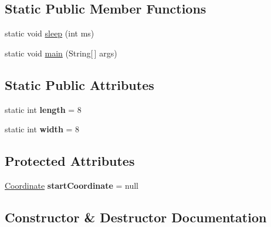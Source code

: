 \subsection*{Static Public Member Functions}
\begin{DoxyCompactItemize}
\item 
static void \hyperlink{classmain_1_1_game_controller_a92e6cb717e1d095d52e1f3db9899b3b4}{sleep} (int ms)
\item 
static void \hyperlink{classmain_1_1_game_controller_a868da5d6ac8b5b1d1c90cfb3957e2c3d}{main} (String\mbox{[}$\,$\mbox{]} args)
\end{DoxyCompactItemize}
\subsection*{Static Public Attributes}
\begin{DoxyCompactItemize}
\item 
\hypertarget{classmain_1_1_game_controller_a7aecbb578b9ec77925dd8a5fbd1c3841}{}\label{classmain_1_1_game_controller_a7aecbb578b9ec77925dd8a5fbd1c3841} 
static int {\bfseries length} = 8
\item 
\hypertarget{classmain_1_1_game_controller_a7b79e272fdf025df06ef83134c5f00f5}{}\label{classmain_1_1_game_controller_a7b79e272fdf025df06ef83134c5f00f5} 
static int {\bfseries width} = 8
\end{DoxyCompactItemize}
\subsection*{Protected Attributes}
\begin{DoxyCompactItemize}
\item 
\hypertarget{classmain_1_1_game_controller_a8a1459a02deb30c69520506ca6d52e4d}{}\label{classmain_1_1_game_controller_a8a1459a02deb30c69520506ca6d52e4d} 
\hyperlink{classmain_1_1model_1_1_coordinate}{Coordinate} {\bfseries start\+Coordinate} = null
\end{DoxyCompactItemize}


\subsection{Constructor \& Destructor Documentation}
\hypertarget{classmain_1_1_game_controller_a455fa762af5d53a326a0c586fe4dcfe4}{}\label{classmain_1_1_game_controller_a455fa762af5d53a326a0c586fe4dcfe4} 
